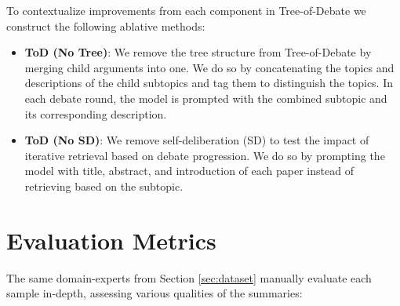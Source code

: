 To contextualize improvements from each component in Tree-of-Debate we construct the following ablative methods:
\begin{itemize}
    \item \textbf{ToD (No Tree)}: We remove the tree structure from Tree-of-Debate by merging child arguments into one. We do so by concatenating the topics and descriptions of the child subtopics and tag them to distinguish the topics. In each debate round, the model is prompted with the combined subtopic and its corresponding description. 
    \item \textbf{ToD (No SD)}: We remove self-deliberation (SD) to test the impact of iterative retrieval based on debate progression. We do so by prompting the model with title, abstract, and introduction of each paper instead of retrieving based on the subtopic. 
\end{itemize}


\section{Evaluation Metrics}
\label{appendix:eval_metrics}
\par The same domain-experts from Section \ref{sec:dataset} manually evaluate each sample in-depth, assessing various qualities of the summaries:

